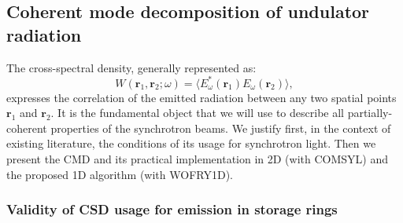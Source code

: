 \documentclass{iucr}              %
\begin{document}
\subsection{Coherent mode decomposition of undulator radiation}\label{sec:CMD}

The cross-spectral density, generally represented as:
\begin{equation}
W(\textbf{r}_1,\textbf{r}_2;\omega) = \big\langle E^*_{\omega}(\textbf{r}_1)  E_{\omega}(\textbf{r}_2)\big\rangle,
\label{eq:CSD_2D}
\end{equation}
expresses the correlation of the emitted radiation between any two spatial points $\textbf{r}_1$ and $\textbf{r}_2$. It is the fundamental object that we will use to describe all partially-coherent properties of the synchrotron beams. We justify first, in the context of existing literature, the conditions of its usage for synchrotron light. Then we present the CMD and its practical implementation in 2D (with COMSYL) and the proposed 1D algorithm (with WOFRY1D).   



\subsubsection{Validity of CSD usage for emission in storage rings\\}\label{sec:validity}
\end{document}
